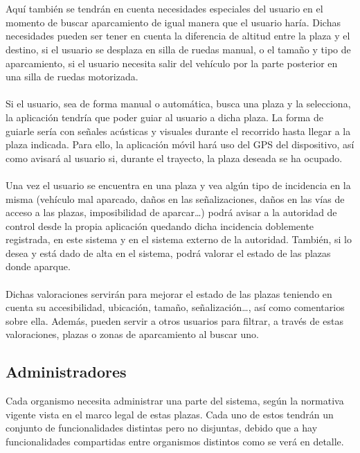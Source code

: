 \\\\
Aquí también se tendrán en cuenta necesidades especiales del usuario en el momento de buscar aparcamiento de igual manera que el usuario haría. Dichas necesidades pueden ser tener en cuenta la diferencia de altitud entre la plaza y el destino, si el usuario se desplaza en silla de ruedas manual, o el tamaño y tipo de aparcamiento, si el usuario necesita salir del vehículo por la parte posterior en una silla de ruedas motorizada.
\\\\
Si el usuario, sea de forma manual o automática, busca una plaza y la selecciona, la aplicación tendría que poder guiar al usuario a dicha plaza. La forma de guiarle sería con señales acústicas y visuales durante el recorrido hasta llegar a la plaza indicada. Para ello, la aplicación móvil hará uso del GPS del dispositivo, así como avisará al usuario si, durante el trayecto, la plaza deseada se ha ocupado.
\\\\
Una vez el usuario se encuentra en una plaza y vea algún tipo de incidencia en la misma (vehículo mal aparcado, daños en las señalizaciones, daños en las vías de acceso a las plazas, imposibilidad de aparcar…) podrá avisar a la autoridad de control desde la propia aplicación quedando dicha incidencia doblemente registrada, en este sistema y en el sistema externo de la autoridad. También, si lo desea y está dado de alta en el sistema, podrá valorar el estado de las plazas donde aparque. 
\\\\
Dichas valoraciones servirán para mejorar el estado de las plazas teniendo en cuenta su accesibilidad, ubicación, tamaño, señalización…, así como comentarios sobre ella. Además, pueden servir a otros usuarios para filtrar, a través de estas valoraciones, plazas o zonas de aparcamiento al buscar uno.
\subsection{Administradores}
Cada organismo necesita administrar una parte del sistema, según la normativa vigente vista en el marco legal de estas plazas. Cada uno de estos tendrán un conjunto de funcionalidades distintas pero no disjuntas, debido que a hay funcionalidades compartidas entre organismos distintos como se verá en detalle.
